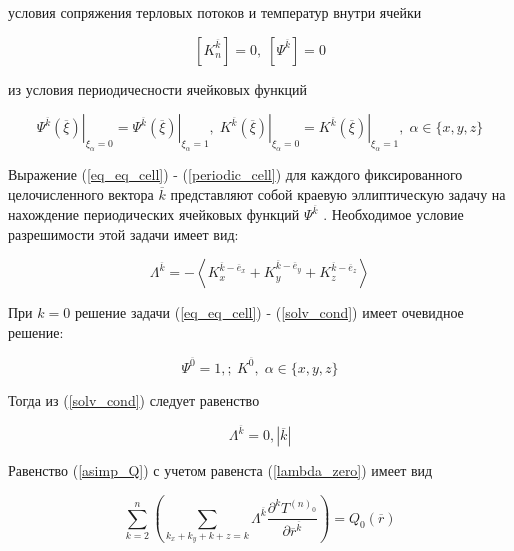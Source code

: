 условия сопряжения терловых потоков и температур внутри ячейки

\begin{equation}
    \left[  K^{ \overline{k}}_n \right] = 0, \; \left[  \Psi^{ \overline{k}}\right] = 0
\end{equation}

из условия периодичесности ячейковых функций

\begin{equation}
    \label{periodic_cell}
    \left. \Psi^{ \overline{k}} \left( \overline{\xi} \right) \right|_{\xi_{\alpha}=0} =
    \left. \Psi^{ \overline{k}} \left( \overline{\xi} \right) \right|_{\xi_{\alpha}=1}, \;
    \left. K^{ \overline{k}} \left( \overline{\xi} \right) \right|_{\xi_{\alpha}=0} =
    \left. K^{ \overline{k}} \left( \overline{\xi} \right) \right|_{\xi_{\alpha}=1}
    , \; \alpha \in \{x,y,z\}
\end{equation}

Выражение 
(\ref{eq_eq_cell})
-
(\ref{periodic_cell})
для каждого фиксированного целочисленного вектора 
$ \overline{k} $
представляют собой краевую эллиптическую задачу на нахождение 
периодических ячейковых функций 
$ \Psi^{ \overline{k}} $
. Необходимое условие разрешимости этой задачи имеет вид:

\begin{equation}
    \label{solv_cond}
    \Lambda^{ \overline{k}} = - \left< K^{ \overline{k} - \overline{e}_x}_x + K^{ \overline{k} - \overline{e}_y}_y + K^{ \overline{k} - \overline{e}_z}_z \right> 
\end{equation}

При 
$k=0$
решение задачи 
(\ref{eq_eq_cell})
-
(\ref{solv_cond})
имеет очевидное решение:

\begin{equation}
    \label{psi_one}
    \Psi^{ \overline{0}} = 1, ;\ K^{ \overline{0}}
    , \; \alpha \in \{x,y,z\}
\end{equation}

Тогда из 
(\ref{solv_cond})
следует равенство

\begin{equation}
    \label{lambda_zero}
    \Lambda^{ \overline{k}} = 0, \left| \overline{k} \right| 
\end{equation}

Равенство 
(\ref{asimp_Q})
с учетом равенста 
(\ref{lambda_zero})
имеет вид

\begin{equation}
    \label{asimp_Q_2}
    \sum^n_{k=2} \left( \sum_{k_x+k_y+k+z=k} \Lambda^{ \overline{k}} \frac{\partial^k T^{(n)_0}}{\partial \overline{r}^{ \overline{k}}} \right) =
    Q_0 \left( \overline{r} \right) 
\end{equation}

